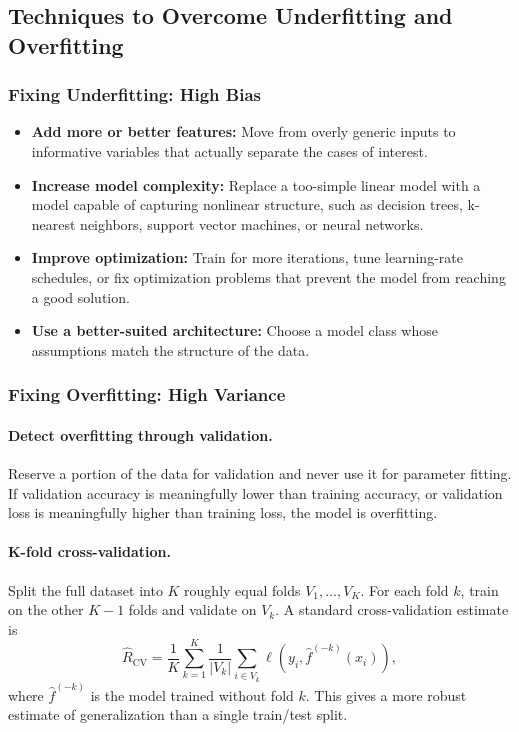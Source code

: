 \documentclass[12pt,openany]{book}
\begin{document}
\subsection{Techniques to Overcome Underfitting and Overfitting}

\subsubsection{Fixing Underfitting: High Bias}

\begin{itemize}[leftmargin=*]
    \item \textbf{Add more or better features:} Move from overly generic inputs to informative variables that actually separate the cases of interest.
    \item \textbf{Increase model complexity:} Replace a too-simple linear model with a model capable of capturing nonlinear structure, such as decision trees, k-nearest neighbors, support vector machines, or neural networks.
    \item \textbf{Improve optimization:} Train for more iterations, tune learning-rate schedules, or fix optimization problems that prevent the model from reaching a good solution.
    \item \textbf{Use a better-suited architecture:} Choose a model class whose assumptions match the structure of the data.
\end{itemize}

\subsubsection{Fixing Overfitting: High Variance}

\paragraph{Detect overfitting through validation.}
Reserve a portion of the data for validation and never use it for parameter fitting. If validation accuracy is meaningfully lower than training accuracy, or validation loss is meaningfully higher than training loss, the model is overfitting.

\paragraph{K-fold cross-validation.}
Split the full dataset into \(K\) roughly equal folds \(V_1,\dots,V_K\). For each fold \(k\), train on the other \(K-1\) folds and validate on \(V_k\). A standard cross-validation estimate is
\begin{equation*}
    \widehat{R}_{\mathrm{CV}}
    = \frac{1}{K}\sum_{k=1}^{K}
      \frac{1}{|V_k|}\sum_{i\in V_k}
      \ell\!\left(y_i, \hat{f}^{(-k)}(x_i)\right),
\end{equation*}
where \(\hat{f}^{(-k)}\) is the model trained without fold \(k\). This gives a more robust estimate of generalization than a single train/test split.
\end{document}
